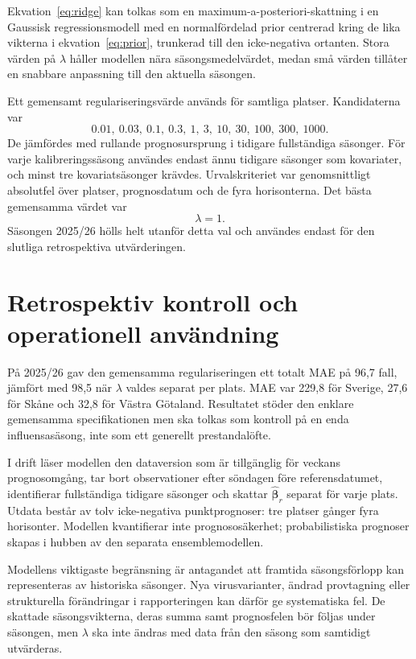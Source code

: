 \documentclass[10pt,a4paper]{article}
\begin{document}
Ekvation~\eqref{eq:ridge} kan tolkas som en maximum-a-posteriori-skattning i
en Gaussisk regressionsmodell med en normalfördelad prior centrerad kring de
lika vikterna i ekvation~\eqref{eq:prior}, trunkerad till den icke-negativa
ortanten. Stora värden på $\lambda$ håller modellen nära säsongsmedelvärdet,
medan små värden tillåter en snabbare anpassning till den aktuella säsongen.

Ett gemensamt regulariseringsvärde används för samtliga platser. Kandidaterna
var
\[
  0.01,\ 0.03,\ 0.1,\ 0.3,\ 1,\ 3,\ 10,\ 30,\ 100,\ 300,\ 1000.
\]
De jämfördes med rullande prognosursprung i tidigare fullständiga säsonger.
För varje kalibreringssäsong användes endast ännu tidigare säsonger som
kovariater, och minst tre kovariatsäsonger krävdes. Urvalskriteriet var
genomsnittligt absolutfel över platser, prognosdatum och de fyra horisonterna.
Det bästa gemensamma värdet var
\[
  \boxed{\lambda=1}.
\]
Säsongen 2025/26 hölls helt utanför detta val och användes endast för den
slutliga retrospektiva utvärderingen.

\section*{Retrospektiv kontroll och operationell användning}

På 2025/26 gav den gemensamma regulariseringen ett totalt MAE på 96,7 fall,
jämfört med 98,5 när $\lambda$ valdes separat per plats. MAE var 229,8 för
Sverige, 27,6 för Skåne och 32,8 för Västra Götaland. Resultatet stöder den
enklare gemensamma specifikationen men ska tolkas som kontroll på en enda
influensasäsong, inte som ett generellt prestandalöfte.

I drift läser modellen den dataversion som är tillgänglig för veckans
prognosomgång, tar bort observationer efter söndagen före referensdatumet,
identifierar fullständiga tidigare säsonger och skattar
$\widehat{\boldsymbol\beta}_r$ separat för varje plats. Utdata består av tolv
icke-negativa punktprognoser: tre platser gånger fyra horisonter. Modellen
kvantifierar inte prognososäkerhet; probabilistiska prognoser skapas i hubben
av den separata ensemblemodellen.

Modellens viktigaste begränsning är antagandet att framtida säsongsförlopp kan
representeras av historiska säsonger. Nya virusvarianter, ändrad provtagning
eller strukturella förändringar i rapporteringen kan därför ge systematiska
fel. De skattade säsongsvikterna, deras summa samt prognosfelen bör följas under
säsongen, men $\lambda$ ska inte ändras med data från den säsong som samtidigt
utvärderas.
\end{document}
